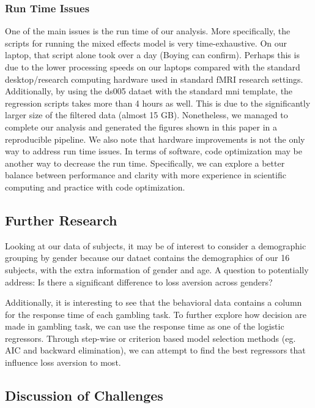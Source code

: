 \documentclass[11pt]{article}
\begin{document}
\subsubsection{Run Time Issues}

One of the main issues is the run time of our analysis. More specifically, 
the scripts for running the mixed effects model is very time-exhaustive. On
our laptop, that script alone took over a day (Boying can confirm). Perhaps
this is due to the lower processing speeds on our laptops compared with the
standard desktop/research computing hardware used in standard fMRI research
settings. Additionally, by using the ds005 dataet with the standard mni 
template, the regression scripts takes more than 4 hours as well. This is due
to the significantly larger size of the filtered data (almost 15 GB). 
Nonetheless, we managed to complete our analysis and generated the figures 
shown in this paper in a reproducible pipeline. We also note that hardware 
improvements is not the only way to address run time issues. In terms of 
software, code optimization may be another way to decrease the run time. 
Specifically, we can explore a better balance between performance and clarity
with more experience in scientific computing and practice with code 
optimization.

\subsection{Further Research}

\par Looking at our data of subjects, it may be of interest to consider a 
demographic grouping by gender because our dataet contains the demographics of 
our 16 subjects, with the extra information of gender and age. A question to 
potentially address: Is there a significant difference to loss aversion across
genders?

\par Additionally, it is interesting to see that the behavioral data contains a 
column for the response time of each gambling task. To further explore how 
decision are made in gambling task, we can use the response time as one of the 
logistic regressors. Through step-wise or criterion based model selection 
methods (eg. AIC and backward elimination), we can attempt to find the best 
regressors that influence loss aversion to most.

\subsection{Discussion of Challenges}
\end{document}
